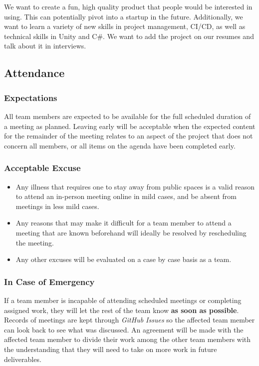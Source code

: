 \documentclass{article}
\begin{document}
We want to create a fun, high quality product that people would be interested in using. This can potentially pivot into a startup in the future. Additionally, we want to learn a variety of new skills in project management, CI/CD, as well as technical skills in Unity and C#. We want to add the project on our resumes and talk about it in interviews.

\subsection*{Attendance}

\subsubsection*{Expectations}

All team members are expected to be available for the full scheduled duration of a meeting as planned. Leaving early will be acceptable when the expected content for the remainder of the meeting relates to an aspect of the project that does not concern all members, or all items on the agenda have been completed early.

\subsubsection*{Acceptable Excuse}

\begin{itemize}
    \item Any illness that requires one to stay away from public spaces is a valid reason to attend an in-person meeting online in mild cases, and be absent from meetings in less mild cases.
    \item Any reasons that may make it difficult for a team member to attend a meeting that are known beforehand will ideally be resolved by rescheduling the meeting.
    \item Any other excuses will be evaluated on a case by case basis as a team.
\end{itemize}

\subsubsection*{In Case of Emergency}

If a team member is incapable of attending scheduled meetings or completing assigned work, they will let the rest of the team know \textbf{as soon as possible}. Records of meetings are kept through \textit{GitHub Issues} so the affected team member can look back to see what was discussed. An agreement will be made with the affected team member to divide their work among the other team members with the understanding that they will need to take on more work in future deliverables.
\end{document}
